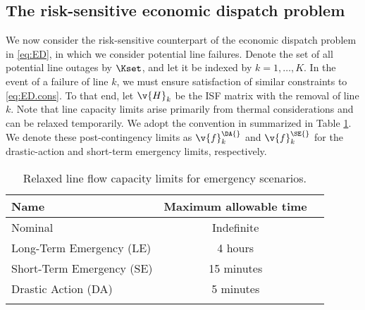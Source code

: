 \subsection{The risk-sensitive economic dispatch problem}
We now consider the risk-sensitive counterpart of the economic dispatch problem in \eqref{eq:ED}, in which we consider potential line failures. Denote the set of all potential line outages by $\Kset$, and let it be indexed by $k = 1, \dots, K$. In the event of a failure of line $k$, we must ensure satisfaction of similar constraints to \eqref{eq:ED.cons}. To that end, let $\v{H}_k$ be the ISF matrix with the removal of line $k$. Note that line capacity limits arise primarily from thermal considerations and can be relaxed temporarily. We adopt the convention in \cite{national2010transmission} summarized in Table \ref{tab:relaxed.line.limits}. We denote these post-contingency limits as $\v{f}_k^{\DA{}}$ and $\v{f}_k^{\SE{}}$ for the drastic-action and short-term emergency limits, respectively.

\begin{table}[ht]
    \centering
    \begin{tabular}{l c c}
        \toprule
         \textbf{Name} & \textbf{Maximum allowable time} \\
         \midrule
         Nominal & Indefinite \\
         Long-Term Emergency (LE) & 4 hours \\
         Short-Term Emergency (SE) & 15 minutes \\
         Drastic Action (DA) & 5 minutes \\
         \bottomrule \\
    \end{tabular}
    \caption{Relaxed line flow capacity limits for emergency scenarios.}
    \label{tab:relaxed.line.limits}
\end{table}

